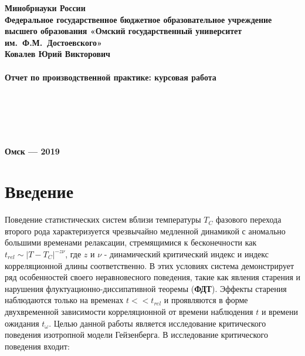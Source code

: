 \documentclass[a4paper,14pt]{extarticle}
\begin{document}
\begin{titlepage}
\begin{center}
{\bf{Минобрнауки России}\\[14pt]
Федеральное государственное бюджетное образовательное учреждение
высшего образования \linebreak
«Омский государственный университет им.~Ф.М.~Достоевского»
}\\[2.2cm]
{\bf Ковалев Юрий Викторович}\\[2mm]
{\footnotesize {}}\\[1cm]
{ \textbf{Отчет по производственной практике: курсовая работа}}\\[3cm]
\end{center}
\hspace*{6cm}{\bf Научный руководитель:}\\
\hspace*{7cm}{\bf д.ф.-м.н, профессор В.В.~Прудников}\\[18pt]
\hspace*{6cm}{\bf Заведующий кафедрой :}\\
\hspace*{7cm}{\bf д.ф.-м.н., профессор В.В.~Прудников}\\[2cm]

\begin{center}
{\bf Омск — 2019}
\end{center}
\end{titlepage}

\newpage
\tableofcontents

\newpage
\section*{Введение}
Поведение статистических систем вблизи температуры $T_C$ фазового перехода второго рода характеризуется чрезвычайно медленной динамикой с аномально большими временами релаксации, стремящимися к бесконечности как $t_{rel} \sim {|T - T_C|}^{-z\nu}$, где $z$ и $\nu$ - динамический критический индекс и индекс корреляционной длины соответственно.
В этих условиях система демонстрирует ряд особенностей своего неравновесного поведения, такие как явления старения и нарушения флуктуационно-диссипативной теоремы (\textbf{ФДТ}).
Эффекты старения наблюдаются только на временах $t << t_{rel}$ и проявляются в форме двухвременной зависимости корреляционной от времени наблюдения $t$ и времени ожидания $t_{\omega}$.
Целью данной работы является исследование критического поведения изотропной модели Гейзенберга. В исследование критического поведения входит:
\end{document}
